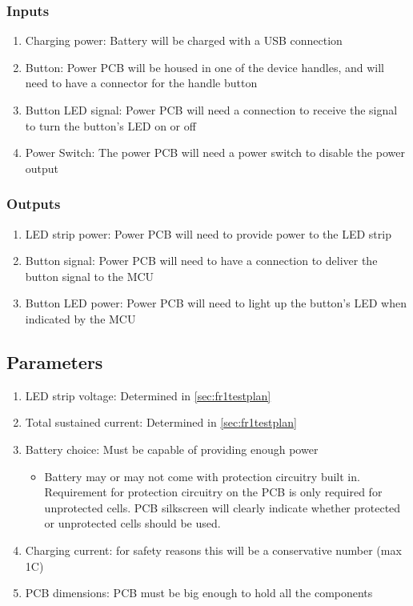 \documentclass{notes}
\begin{document}
\subsubsection{Inputs}

\begin{enumerate}
    \item Charging power: Battery will be charged with a USB connection
    \item Button: Power PCB will be housed in one of the device handles, and will need to have a connector for the handle button
    \item Button LED signal: Power PCB will need a connection to receive the signal to turn the button's LED on or off
    \item Power Switch: The power PCB will need a power switch to disable the power output
\end{enumerate}

\subsubsection{Outputs}

\begin{enumerate}
    \item LED strip power: Power PCB will need to provide power to the LED strip
    \item Button signal: Power PCB will need to have a connection to deliver the button signal to the MCU
    \item Button LED power: Power PCB will need to light up the button's LED when indicated by the MCU
\end{enumerate}

\subsection{Parameters}

\begin{enumerate}
    \item LED strip voltage: Determined in \autoref{sec:fr1testplan}
    \item Total sustained current: Determined in \autoref{sec:fr1testplan}
    \item Battery choice: Must be capable of providing enough power
          \begin{itemize}
              \item Battery may or may not come with protection circuitry built in.
                    Requirement for protection circuitry on the PCB is only required for unprotected cells.
                    PCB silkscreen will clearly indicate whether protected or unprotected cells should be used.
          \end{itemize}
    \item Charging current: for safety reasons this will be a conservative number (max 1C)
    \item PCB dimensions: PCB must be big enough to hold all the components
\end{enumerate}
\end{document}
